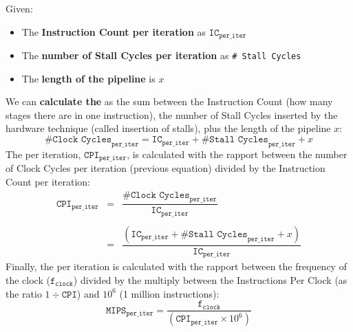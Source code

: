 \begin{definitionbox}
    Given:
    \begin{itemize}
        \item The \textbf{Instruction Count per iteration} as $\texttt{IC}_{\texttt{per\_iter}}$

        \item The \textbf{number of Stall Cycles per iteration} as \texttt{\# Stall Cycles}

        \item The \textbf{length of the pipeline} is $x$
    \end{itemize}
    We can \textbf{calculate the}  as the sum between the Instruction Count (how many stages there are in one instruction), the number of Stall Cycles inserted by the hardware technique (called insertion of stalls), plus the length of the pipeline $x$:
    \begin{equation}\label{eq: clock cycles per iteration}
        \texttt{\# Clock Cycles}_{\texttt{per\_iter}} = \texttt{IC}_{\texttt{per\_iter}} + \texttt{\# Stall Cycles}_{\texttt{per\_iter}} + x
    \end{equation}
    The  per iteration, $\texttt{CPI}_{\texttt{per\_iter}}$, is calculated with the rapport between the number of Clock Cycles per iteration (previous equation) divided by the Instruction Count per iteration:
    \begin{equation}\label{eq: clock per instruction per iteration}
        \begin{array}{rcl}
            \texttt{CPI}_{\texttt{per\_iter}} &=& \dfrac{
                \texttt{\# Clock Cycles}_{\texttt{per\_iter}}
            }{
                \texttt{IC}_{\texttt{per\_iter}}
            } \\ \\
            &=& \dfrac{
                \left(\texttt{IC}_{\texttt{per\_iter}} + \texttt{\# Stall Cycles}_{\texttt{per\_iter}} + x\right)
            }{
                \texttt{IC}_{\texttt{per\_iter}}
            }
        \end{array}
    \end{equation}
    Finally, the  per iteration is calculated with the rapport between the frequency of the clock ($\texttt{f}_{\texttt{clock}}$) divided by the multiply between the Instructions Per Clock (as the ratio $1 \div \texttt{CPI}$) and $10^{6}$ (1 million instructions):
    \begin{equation}\label{eq: MIPS per iteration}
        \texttt{MIPS}_{\texttt{per\_iter}}
        =
        \dfrac{
            \texttt{f}_{\texttt{clock}}
        }{
            \left(
                \texttt{CPI}_{\texttt{per\_iter}} \times 10^{6}
            \right)
        }
    \end{equation}
\end{definitionbox}

